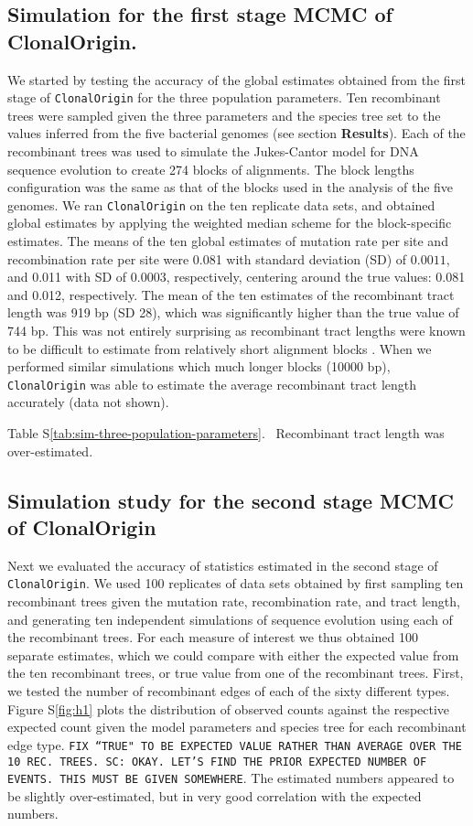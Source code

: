 \documentclass[english]{article}
\begin{document}
\subsection*{Simulation for the first stage MCMC of ClonalOrigin.}
We started by testing the accuracy
of the global estimates obtained from the first stage of \texttt{ClonalOrigin}
for the three population parameters.  Ten recombinant trees were sampled given
the three parameters and the species tree  set to the values inferred from the
five bacterial genomes (see section \textbf{Results}).  Each of the recombinant
trees was used to simulate the Jukes-Cantor model for DNA sequence evolution to
create 274 blocks of alignments.  The block lengths configuration was the same
as that of the blocks used in the analysis of the five genomes.  We ran
\texttt{ClonalOrigin} on the ten replicate data sets, and obtained global
estimates by applying the weighted median scheme for the block-specific
estimates. The means of the ten global estimates of mutation rate per site and
recombination rate per site were 0.081 with standard deviation (SD) of $0.0011$,
and 0.011 with SD of $0.0003$, respectively, centering around the true values:
0.081 and 0.012, respectively. The mean of the ten estimates of the recombinant
tract length was 919 bp (SD 28), which was significantly higher than the true
value of 744 bp. This was not entirely surprising as recombinant tract lengths
were known to be difficult to estimate from relatively short alignment blocks
\citep{Didelot2010}. When we performed similar simulations which much longer
blocks (10000 bp), \texttt{ClonalOrigin} was able to estimate the average
recombinant tract length accurately (data not shown).

Table S\ref{tab:sim-three-population-parameters}.~
Recombinant tract length was over-estimated.


\subsection*{Simulation study for the second stage MCMC of ClonalOrigin}
Next we evaluated the accuracy of statistics estimated in the second stage of
\texttt{ClonalOrigin}. We used 100 replicates of data sets obtained by first
sampling ten recombinant trees given the mutation rate, recombination rate, and
tract length, and generating ten independent simulations of sequence evolution
using each of the recombinant trees. For each measure of interest we thus
obtained 100 separate estimates, which we could compare with either the expected
value from the ten recombinant trees, or true value from one of the recombinant
trees.  First, we tested the number of recombinant edges of each of the sixty
different types. Figure S\ref{fig:h1} plots  the distribution of observed counts
against the respective expected count given the model parameters and species
tree for each recombinant edge type.  \texttt{FIX ``TRUE" TO BE EXPECTED VALUE
RATHER THAN AVERAGE OVER THE 10 REC.  TREES. SC: OKAY. LET'S FIND THE PRIOR
EXPECTED NUMBER OF EVENTS. THIS MUST BE GIVEN SOMEWHERE}.  The estimated numbers
appeared to be slightly over-estimated, but in very good correlation with the
expected numbers. 
\end{document}
